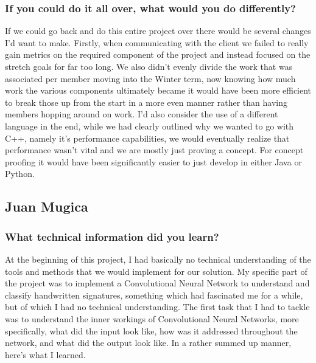 \documentclass[article, onecolumn, draftclsnofoot,10pt, compsoc]{IEEEtran}
\begin{document}
\subsubsection{If you could do it all over, what would you do differently?}
If we could go back and do this entire project over there would be several changes I’d want to make. Firstly, when communicating with the client we failed to really gain metrics on the required component of the project and instead focused on the stretch goals for far too long. We also didn’t evenly divide the work that was associated per member moving into the Winter term, now knowing how much work the various components ultimately became it would have been more efficient to break those up from the start in a more even manner rather than having members hopping around on work. I’d also consider the use of a different language in the end, while we had clearly outlined why we wanted to go with C++, namely it’s performance capabilities, we would eventually realize that performance wasn’t vital and we are mostly just proving a concept. For concept proofing it would have been significantly easier to just develop in either Java or Python.


\subsection{Juan Mugica}
\subsubsection{What technical information did you learn?}
At the beginning of this project, I had basically no technical understanding of the tools and methods that we would implement for our solution. My specific part of the project was to implement a Convolutional Neural Network to understand and classify handwritten signatures, something which had fascinated me for a while, but of which I had no technical understanding. The first task that I had to tackle was to understand the inner workings of Convolutional Neural Networks, more specifically, what did the input look like, how was it addressed throughout the network, and what did the output look like. In a rather summed up manner, here’s what I learned.
\end{document}
